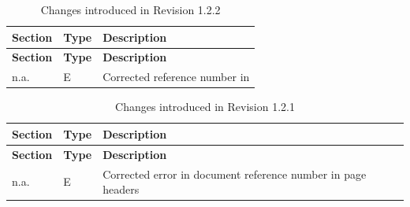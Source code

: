 \documentclass[requirements]{../fwprofile}
\begin{document}
\begin{longtable}{|p{1.5cm}|p{1cm}|p{8cm}|}
\caption{Changes introduced in Revision 1.2.2} \\
\hline
\rowcolor{light-gray}
\textbf{Section} & \textbf{Type} & \textbf{Description} \\
\hline\hline
\endfirsthead
\rowcolor{light-gray}
\textbf{Section} & \textbf{Type} & \textbf{Description} \\
\hline\hline
\endhead
n.a. & E & Corrected reference number in \cite{ref:um}\\
\hline
\end{longtable}

\begin{longtable}{|p{1.5cm}|p{1cm}|p{8cm}|}
\caption{Changes introduced in Revision 1.2.1} \\
\hline
\rowcolor{light-gray}
\textbf{Section} & \textbf{Type} & \textbf{Description} \\
\hline\hline
\endfirsthead
\rowcolor{light-gray}
\textbf{Section} & \textbf{Type} & \textbf{Description} \\
\hline\hline
\endhead
n.a. & E & Corrected error in document reference number in page headers\\
\hline
\end{longtable}

\newpage
\end{document}
